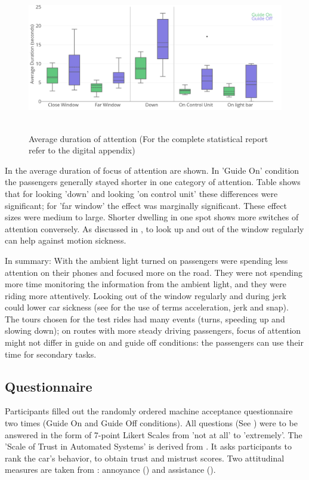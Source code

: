 \begin{figure}
    \includegraphics[width=1\textwidth]{fig/Average.png}\hfill\
    \caption[Average Duration of Attention]{Average duration of attention (For the complete statistical report refer to the digital appendix)}
    \label{fig:attentionAverage}
\end{figure}


In \emph{} the average duration of focus of attention are shown. In 'Guide On' condition the passengers generally stayed shorter in one category of attention. Table \emph{} shows that for looking 'down' and looking 'on control unit' these differences were significant; for 'far window' the effect was marginally significant. These effect sizes were medium to large. Shorter dwelling in one spot shows more switches of attention conversely. As discussed in \emph{}, to look up and out of the window regularly can help against motion sickness. 

In summary: With the ambient light turned on passengers were spending less attention on their phones and focused more on the road. They were not spending more time monitoring the information from the ambient light, and they were riding more attentively. Looking out of the window regularly and during jerk could lower car sickness (see \citep{Eager2016BeyondDerivatives} for the use of terms acceleration, jerk and snap). The tours chosen for the test rides had many events (turns, speeding up and slowing down); on routes with more steady driving passengers, focus of attention might not differ in guide on and guide off conditions: the passengers can use their time for secondary tasks. 

\subsection{Questionnaire}
\label{ssec:questionaire}
Participants filled out the randomly ordered machine acceptance questionnaire two times (Guide On and Guide Off conditions). All questions (See  \emph{}) were to be answered in the form of 7-point Likert Scales from 'not at all' to 'extremely'. The 'Scale of Trust in Automated Systems' is derived from \cite{Jian2010}. It asks participants to rank the car's behavior, to obtain trust and mistrust scores. Two attitudinal measures are taken from \cite{Koo2015}: annoyance () and assistance (). 

